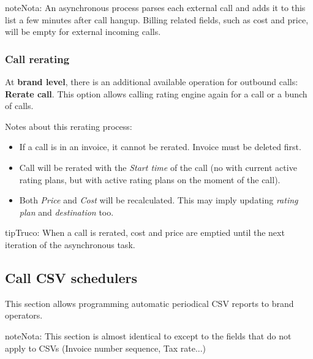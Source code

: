 \documentclass[letterpaper,10pt,spanish]{sphinxmanual}
\begin{document}
\begin{notice}{note}{Nota:}
An asynchronous process parses each external call and adds it to this list a few minutes after call hangup. Billing related fields, such as cost and price, will be empty for external incoming calls.
\end{notice}


\subsubsection{Call rerating}
\label{administration_portal/brand/calls/external_calls:call-rerating}
At \textbf{brand level}, there is an additional available operation for outbound calls: \textbf{Rerate call}. This option allows calling rating engine again for a call or a bunch of calls.

Notes about this rerating process:
\begin{itemize}
\item {} 
If a call is in an invoice, it cannot be rerated. Invoice must be deleted first.

\item {} 
Call will be rerated with the \emph{Start time} of the call (no with current active rating plans, but with active rating plans
on the moment of the call).

\item {} 
Both \emph{Price} and \emph{Cost} will be recalculated. This may imply updating \emph{rating plan} and \emph{destination} too.

\end{itemize}

\begin{notice}{tip}{Truco:}
When a call is rerated, cost and price are emptied until the next iteration of the asynchronous task.
\end{notice}


\subsection{Call CSV schedulers}
\label{administration_portal/brand/calls/call_csv_schedulers:call-csv-schedulers}\label{administration_portal/brand/calls/call_csv_schedulers::doc}
This section allows programming automatic periodical CSV reports to brand operators.

\begin{notice}{note}{Nota:}
This section is almost identical to {\hyperref[administration_portal/brand/invoicing/invoice_schedulers:invoice\string-schedulers]{}} except to the
fields that do not apply to CSVs (Invoice number sequence, Tax rate...)
\end{notice}
\end{document}
